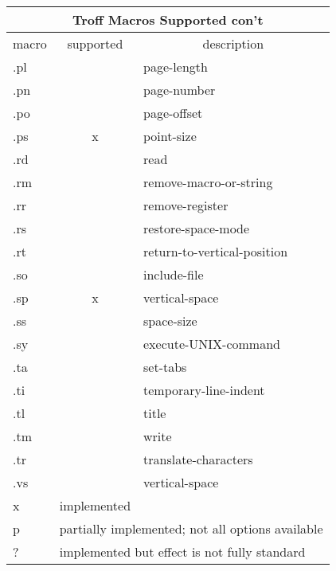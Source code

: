 \noindent
\begin{center}
\begin{tabular}{|l|c|l|}
\hline
\multicolumn{3}{|c|}{{\vrule height12pt width0pt depth3.5pt\Large
Troff Macros Supported con't}}\\ 
\hline\hline
macro&	 supported&\multicolumn{1}{|c|}{description}\\
\hline
.pl&	&		page-length\\
.pn& 	&		page-number\\
.po&	&		page-offset\\
.ps&	x&		point-size\\
.rd&	&		read\\
.rm&	&		remove-macro-or-string\\
.rr&	&		remove-register\\
.rs&	&		restore-space-mode\\
.rt&	&		return-to-vertical-position\\
.so&	&		include-file\\
.sp&	x&		vertical-space\\
.ss&	&		space-size\\
.sy&	&		execute-UNIX-command\\
.ta&	&		set-tabs\\
.ti&	&		temporary-line-indent\\
.tl&	&		title\\
.tm&	&		write\\
.tr&	&		translate-characters\\
.vs&	&		vertical-space\\
\hline
\hline
x&\multicolumn{2}{|l|}{implemented}\\
p&\multicolumn{2}{|l|}{partially implemented; not all options available}\\
?&\multicolumn{2}{|l|}{implemented but effect is not fully standard}\\
\hline
\end{tabular}\end{center}
\medskip

